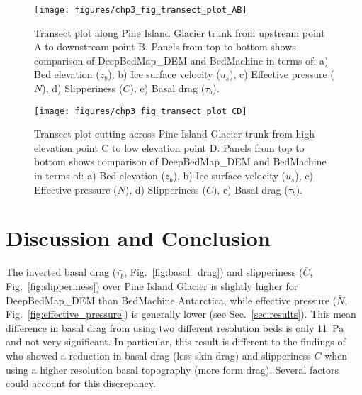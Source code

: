 \begin{figure}[htbp]
  \texttt{[image: figures/chp3\_fig\_transect\_plot\_AB]}
  \caption[Transect plot along Pine Island Glacier trunk]{
    Transect plot along Pine Island Glacier trunk from upstream point A to downstream point B.
    Panels from top to bottom shows comparison of DeepBedMap\_DEM and BedMachine in terms of:
    a) Bed elevation ($z_b$),
    b) Ice surface velocity ($u_s$),
    c) Effective pressure ($N$),
    d) Slipperiness ($C$),
    e) Basal drag ($\tau_b$).
  }
  \label{fig:transect_AB}
\end{figure}

\begin{figure}[htbp]
  \texttt{[image: figures/chp3\_fig\_transect\_plot\_CD]}
  \caption[Transect plot cutting across Pine Island Glacier trunk]{
    Transect plot cutting across Pine Island Glacier trunk from high elevation point C to low elevation point D.
    Panels from top to bottom shows comparison of DeepBedMap\_DEM and BedMachine in terms of:
    a) Bed elevation ($z_b$),
    b) Ice surface velocity ($u_s$),
    c) Effective pressure ($N$),
    d) Slipperiness ($C$),
    e) Basal drag ($\tau_b$).
  }
  \label{fig:transect_CD}
\end{figure}


\clearpage
\section{Discussion and Conclusion}

The inverted basal drag ($\bar{\tau_b}$, Fig.~\ref{fig:basal_drag}) and slipperiness ($\bar{C}$, Fig.~\ref{fig:slipperiness}) over Pine Island Glacier is slightly higher for DeepBedMap\_DEM than BedMachine Antarctica, while effective pressure ($\bar{N}$, Fig.~\ref{fig:effective_pressure}) is generally lower (see Sec.~\ref{sec:results}).
This mean difference in basal drag from using two different resolution beds is only \SI{11}{\pascal} and not very significant.
In particular, this result is different to the findings of \citet{Kyrke-SmithRelevanceDetailBasal2018} who showed a reduction in basal drag (less skin drag) and slipperiness $C$ when using a higher resolution basal topography (more form drag).
Several factors could account for this discrepancy.

